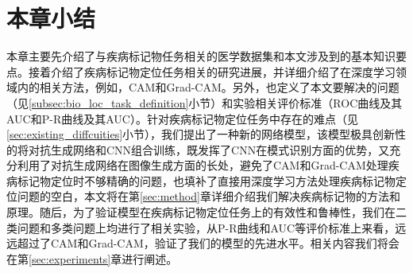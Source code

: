 \section{本章小结}
本章主要先介绍了与疾病标记物任务相关的医学数据集和本文涉及到的基本知识要点。接着介绍了疾病标记物定位任务相关的研究进展，并详细介绍了在深度学习领域内的相关方法，例如，CAM和Grad-CAM。另外，也定义了本文要解决的问题（见\ref{subsec:bio_loc_task_definition}小节）和实验相关评价标准（ROC曲线及其AUC和P-R曲线及其AUC）。针对疾病标记物定位任务中存在的难点（见\ref{sec:existing_diffcuities}小节），我们提出了一种新的网络模型，该模型极具创新性的将对抗生成网络和CNN组合训练，既发挥了CNN在模式识别方面的优势，又充分利用了对抗生成网络在图像生成方面的长处，避免了CAM和Grad-CAM处理疾病标记物定位时不够精确的问题，也填补了直接用深度学习方法处理疾病标记物定位问题的空白，本文将在第\ref{sec:method}章详细介绍我们解决疾病标记物的方法和原理。随后，为了验证模型在疾病标记物定位任务上的有效性和鲁棒性，我们在二类问题和多类问题上均进行了相关实验，从P-R曲线和AUC等评价标准上来看，远远超过了CAM和Grad-CAM，验证了我们的模型的先进水平。相关内容我们将会在第\ref{sec:experiments}章进行阐述。